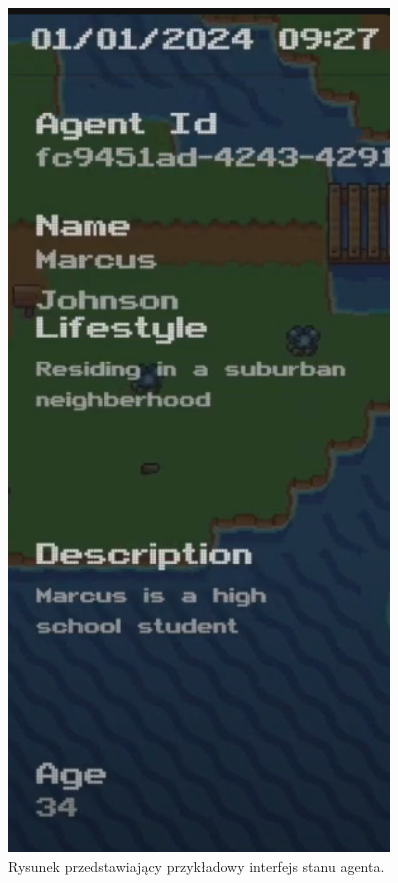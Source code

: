 \begin{figure}[htbp]
    \centering
    \includegraphics[width=0.9\textwidth, height=0.6\textheight]{images/411state.png}
    \caption{Rysunek przedstawiający przykładowy interfejs stanu agenta.}
    \label{fig:stateagent}
\end{figure}


